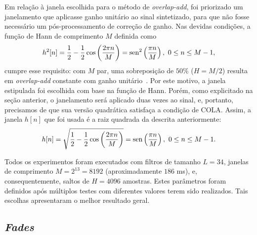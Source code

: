 Em relação à janela escolhida para o método de \textit{overlap-add}, foi priorizado um
janelamento que aplicasse ganho unitário ao sinal sintetizado, para que não fosse
necessário um pós-processamento de correção de ganho. Nas devidas condições, a função
de Hann de comprimento $M$ definida como
\begin{equation}
	h^2[n] = \frac{1}{2} - \frac{1}{2}\cos\left(\frac{2\pi n}{M}\right) = \operatorname{sen}^2\left( \frac{\pi n}{M} \right),\ 0 \leq n \leq M-1,
\end{equation}
cumpre esse requisito: com $M$ par, uma sobreposição de $50\%$ ($H = M/2$) resulta em \textit{overlap-add} constante com ganho unitário~\cite{heinzel-2002}. Por este motivo, a janela estipulada foi escolhida com base na função de Hann. Porém, como explicitado na seção anterior, o janelamento será aplicado duas vezes ao sinal, e, portanto, precisamos de que sua versão quadrática satisfaça a condição de COLA. Assim, a janela $h[n]$ que foi usada é a raiz quadrada da descrita anteriormente:
\begin{equation}
	h[n] = \sqrt{\frac{1}{2} - \frac{1}{2}\cos\left(\frac{2\pi n}{M}\right)} = \operatorname{sen}\left( \frac{\pi n}{M} \right),\ 0 \leq n \leq  M-1.
\end{equation}

Todos os experimentos foram executados com filtros de tamanho $L = 34$, janelas de
comprimento $M = 2^{13} = 8192$ (aproximadamente $186$ ms), e, consequentemente, saltos
de $H = 4096$ amostras. Estes parâmetros foram definidos após múltiplos testes com
diferentes valores terem sido realizados. Tais escolhas apresentaram o melhor resultado
geral.

\subsection{\textit{Fades}}

